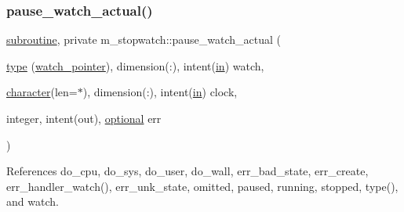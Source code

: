 \subsubsection{\texorpdfstring{pause\+\_\+watch\+\_\+actual()}{pause\_watch\_actual()}}
{\footnotesize\ttfamily \hyperlink{M__stopwatch_83_8txt_acfbcff50169d691ff02d4a123ed70482}{subroutine}, private m\+\_\+stopwatch\+::pause\+\_\+watch\+\_\+actual (\begin{DoxyParamCaption}\item[{\hyperlink{stop__watch_83_8txt_a70f0ead91c32e25323c03265aa302c1c}{type} (\hyperlink{structm__stopwatch_1_1watch__pointer}{watch\+\_\+pointer}), dimension(\+:), intent(\hyperlink{M__journal_83_8txt_afce72651d1eed785a2132bee863b2f38}{in})}]{watch,  }\item[{\hyperlink{option__stopwatch_83_8txt_abd4b21fbbd175834027b5224bfe97e66}{character}(len=$\ast$), dimension(\+:), intent(\hyperlink{M__journal_83_8txt_afce72651d1eed785a2132bee863b2f38}{in})}]{clock,  }\item[{integer, intent(out), \hyperlink{option__stopwatch_83_8txt_aa4ece75e7acf58a4843f70fe18c3ade5}{optional}}]{err }\end{DoxyParamCaption})\hspace{0.3cm}{\ttfamily [private]}}



References do\+\_\+cpu, do\+\_\+sys, do\+\_\+user, do\+\_\+wall, err\+\_\+bad\+\_\+state, err\+\_\+create, err\+\_\+handler\+\_\+watch(), err\+\_\+unk\+\_\+state, omitted, paused, running, stopped, type(), and watch.

\mbox{\label{namespacem__stopwatch_a7e89d5f8738809ee67019645810aa9d5}} 
